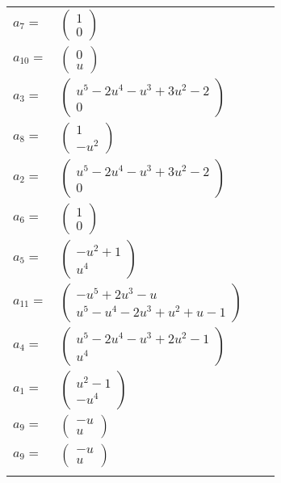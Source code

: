 \documentclass[1p]{elsarticle_modified}
\theoremstyle{definition}
\begin{document}
\begin{tabular}{m{7pt} m{180pt} m{7pt} m{180pt} }
\flushright $a_{7}=$&$\begin{pmatrix}1\\0\end{pmatrix}$ \\
\flushright $a_{10}=$&$\begin{pmatrix}0\\u\end{pmatrix}$ \\
\flushright $a_{3}=$&$\begin{pmatrix}u^5-2 u^4- u^3+3 u^2-2\\0\end{pmatrix}$ \\
\flushright $a_{8}=$&$\begin{pmatrix}1\\- u^2\end{pmatrix}$ \\
\flushright $a_{2}=$&$\begin{pmatrix}u^5-2 u^4- u^3+3 u^2-2\\0\end{pmatrix}$ \\
\flushright $a_{6}=$&$\begin{pmatrix}1\\0\end{pmatrix}$ \\
\flushright $a_{5}=$&$\begin{pmatrix}- u^2+1\\u^4\end{pmatrix}$ \\
\flushright $a_{11}=$&$\begin{pmatrix}- u^5+2 u^3- u\\u^5- u^4-2 u^3+u^2+u-1\end{pmatrix}$ \\
\flushright $a_{4}=$&$\begin{pmatrix}u^5-2 u^4- u^3+2 u^2-1\\u^4\end{pmatrix}$ \\
\flushright $a_{1}=$&$\begin{pmatrix}u^2-1\\- u^4\end{pmatrix}$ \\
\flushright $a_{9}=$&$\begin{pmatrix}- u\\u\end{pmatrix}$\\ \flushright $a_{9}=$&$\begin{pmatrix}- u\\u\end{pmatrix}$\\&\end{tabular}
\end{document}
